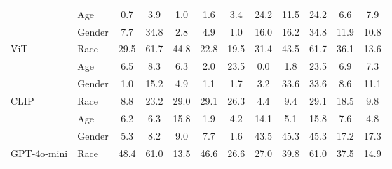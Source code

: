\begin{table}[b]
{\begin{tabular}{ll|>{\color{mediumgray}}c>{\color{mediumgray}}c>{\color{mediumgray}}c>{\color{mediumgray}}c>{\color{mediumgray}}c>{\color{mediumgray}}c>{\color{mediumgray}}c|ccc}
\multicolumn{1}{l|}{}                              & Age & 0.7 & 3.9 & 1.0 & 1.6 & 3.4 & 24.2 & 11.5 & 24.2 & 6.6 & 7.9 \\
\multicolumn{1}{l|}{}                              & Gender & 7.7 & 34.8 & 2.8 & 4.9 & 1.0 & 16.0 & 16.2 & 34.8 & 11.9 & 10.8 \\
\multicolumn{1}{l|}{\multirow{-3}{*}{ViT}}         & Race & 29.5 & 61.7 & 44.8 & 22.8 & 19.5 & 31.4 & 43.5 & 61.7 & 36.1 & 13.6 \\ \hline
\multicolumn{1}{l|}{}                              & Age & 6.5 & 8.3 & 6.3 & 2.0 & 23.5 & 0.0 & 1.8 & 23.5 & 6.9 & 7.3 \\
\multicolumn{1}{l|}{}                              & Gender & 1.0 & 15.2 & 4.9 & 1.1 & 1.7 & 3.2 & 33.6 & 33.6 & 8.6 & 11.1 \\
\multicolumn{1}{l|}{\multirow{-3}{*}{CLIP}}         & Race & 8.8 & 23.2 & 29.0 & 29.1 & 26.3 & 4.4 & 9.4 & 29.1 & 18.5 & 9.8 \\ \hline
\multicolumn{1}{l|}{}                              & Age & 6.2 & 6.3 & 15.8 & 1.9 & 4.2 & 14.1 & 5.1 & 15.8 & 7.6 & 4.8 \\
\multicolumn{1}{l|}{}                              & Gender & 5.3 & 8.2 & 9.0 & 7.7 & 1.6 & 43.5 & 45.3 & 45.3 & 17.2 & 17.3 \\
\multicolumn{1}{l|}{\multirow{-3}{*}{GPT-4o-mini}} & Race & 48.4 & 61.0 & 13.5 & 46.6 & 26.6 & 27.0 & 39.8 & 61.0 & 37.5 & 14.9 \\ \hline
\end{tabular}
}
\end{table}
